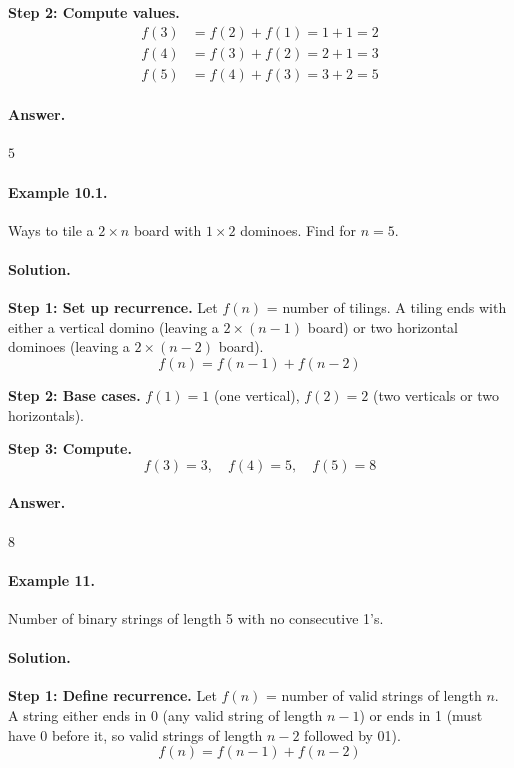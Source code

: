 \documentclass[12pt]{extarticle}
\begin{document}
\textbf{Step 2: Compute values.}
\begin{align*}
f(3) &= f(2) + f(1) = 1 + 1 = 2 \\
f(4) &= f(3) + f(2) = 2 + 1 = 3 \\
f(5) &= f(4) + f(3) = 3 + 2 = 5
\end{align*}

\paragraph{Answer.} $\boxed{5}$

\paragraph{Example 10.1.} Ways to tile a $2\times n$ board with $1\times 2$ dominoes. Find for $n=5$.

\paragraph{Solution.}
\textbf{Step 1: Set up recurrence.} Let $f(n)$ = number of tilings. A tiling ends with either a vertical domino (leaving a $2\times(n-1)$ board) or two horizontal dominoes (leaving a $2\times(n-2)$ board).
\[
f(n) = f(n-1) + f(n-2)
\]

\textbf{Step 2: Base cases.} $f(1) = 1$ (one vertical), $f(2) = 2$ (two verticals or two horizontals).

\textbf{Step 3: Compute.}
\[
f(3) = 3, \quad f(4) = 5, \quad f(5) = 8
\]

\paragraph{Answer.} $\boxed{8}$

\paragraph{Example 11.} Number of binary strings of length 5 with no consecutive 1's.

\paragraph{Solution.}
\textbf{Step 1: Define recurrence.} Let $f(n)$ = number of valid strings of length $n$. A string either ends in 0 (any valid string of length $n-1$) or ends in 1 (must have 0 before it, so valid strings of length $n-2$ followed by 01).
\[
f(n) = f(n-1) + f(n-2)
\]
\end{document}
